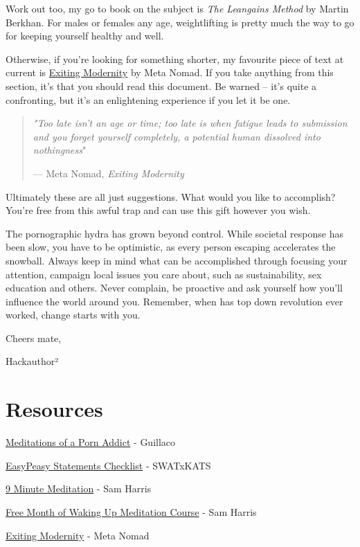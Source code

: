 \documentclass[
]{book}
\begin{document}
Work out too, my go to book on the subject is \emph{The Leangains Method} by Martin Berkhan. For males or females any age, weightlifting is pretty much the way to go for keeping yourself healthy and well.

Otherwise, if you're looking for something shorter, my favourite piece of text at current is \href{https://www.meta-nomad.net/exiting-modernity/}{Exiting Modernity} by Meta Nomad. If you take anything from this section, it's that you should read this document. Be warned -- it's quite a confronting, but it's an enlightening experience if you let it be one.

\begin{quote}
\emph{"Too late isn't an age or time; too late is when fatigue leads to submission and you forget yourself completely, a potential human dissolved into nothingness}"

--- Meta Nomad, \emph{Exiting Modernity}
\end{quote}

Ultimately these are all just suggestions. What would you like to accomplish? You're free from this awful trap and can use this gift however you wish.

The pornographic hydra has grown beyond control. While societal response has been slow, you have to be optimistic, as every person escaping accelerates the snowball. Always keep in mind what can be accomplished through focusing your attention, campaign local issues you care about, such as sustainability, sex education and others. Never complain, be proactive and ask yourself how you'll influence the world around you. Remember, when has top down revolution ever worked, change starts with you.

Cheers mate,

Hackauthor²

\hypertarget{resources}{%
\chapter*{Resources}\label{resources}}

\href{https://mega.nz/file/DlxiFACJ\#FLglnhxnenKVIDn9JVQHI1v_ZGs1yzC3Kvc0mLf13ds}{Meditations of a Porn Addict} - Guillaco

\href{https://pastebin.com/dybv6qkD}{EasyPeasy Statements Checklist} - SWATxKATS

\href{https://www.youtube.com/watch?v=tw7XBKhZJh4}{9 Minute Meditation} - Sam Harris

\href{https://share.wakingup.com/a13290}{Free Month of Waking Up Meditation Course} - Sam Harris

\href{https://meta-nomad.net/exiting-modernity}{Exiting Modernity} - Meta Nomad

  
\end{document}
